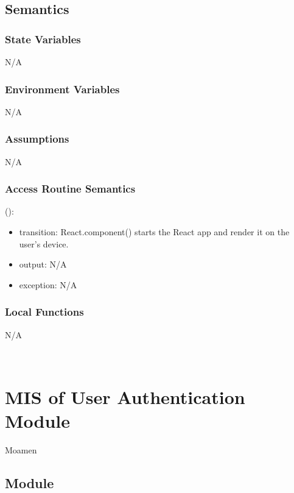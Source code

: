 \documentclass[12pt, titlepage]{article}
\begin{document}
\subsection{Semantics}

\subsubsection{State Variables}

N/A

\subsubsection{Environment Variables}

N/A

\subsubsection{Assumptions}

N/A

\subsubsection{Access Routine Semantics}

\noindent {}():
\begin{itemize}
\item transition: React.component() starts the React app and render it on the user's device.
\item output: N/A 
\item exception: N/A 
\end{itemize}

\subsubsection{Local Functions}

N/A


\newpage
~\newpage



  
\section{MIS of User Authentication Module} \label{Module_UserAuth} Moamen

\subsection{Module}
\end{document}
